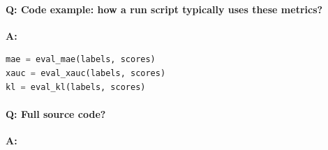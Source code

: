 \documentclass[11pt]{article}
\begin{document}
\paragraph{Q: Code example: how a run script typically uses these metrics?}
\textbf{A:}
\begin{lstlisting}[language=Python]
mae = eval_mae(labels, scores)
xauc = eval_xauc(labels, scores)
kl = eval_kl(labels, scores)
\end{lstlisting}

\paragraph{Q: Full source code?}
\textbf{A:}

\end{document}
